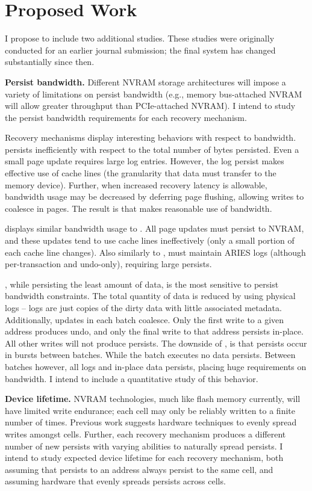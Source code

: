 \section{Proposed Work}
\label{sec:OLTP_eval:Proposed}

I propose to include two additional studies.
These studies were originally conducted for an earlier journal submission; the final system has changed substantially since then.

\textbf{Persist bandwidth.}
Different NVRAM storage architectures will impose a variety of limitations on persist bandwidth (e.g., memory bus-attached NVRAM will allow greater throughput than PCIe-attached NVRAM).
I intend to study the persist bandwidth requirements for each recovery mechanism.

Recovery mechanisms display interesting behaviors with respect to bandwidth.
\NVDisk persists inefficiently with respect to the total number of bytes persisted.
Even a small page update requires large log entries.
However, the log persist makes effective use of cache lines (the granularity that data must transfer to the memory device).
Further, when increased recovery latency is allowable, bandwidth usage may be decreased by deferring page flushing, allowing writes to coalesce in pages.
The result is that \NVDisk makes reasonable use of bandwidth.

\InPlace displays similar bandwidth usage to \NVDisk.
All page updates must persist to NVRAM, and these updates tend to use cache lines ineffectively (only a small portion of each cache line changes).
Also similarly to \NVDisk, \InPlace must maintain ARIES logs (although per-transaction and undo-only), requiring large persists.

\GroupCommit, while persisting the least amount of data, is the most sensitive to persist bandwidth constraints.
The total quantity of data is reduced by using physical logs -- logs are just copies of the dirty data with little associated metadata.
Additionally, updates in each batch coalesce.
Only the first write to a given address produces undo, and only the final write to that address persists in-place.
All other writes will not produce persists.
The downside of \GroupCommit, is that persists occur in bursts between batches.
While the batch executes no data persists.
Between batches however, all logs and in-place data persists, placing huge requirements on bandwidth.
I intend to include a quantitative study of this behavior.

\textbf{Device lifetime.}
NVRAM technologies, much like flash memory currently, will have limited write endurance; each cell may only be reliably written to a finite number of times.
Previous work suggests hardware techniques to evenly spread writes amongst cells.
Further, each recovery mechanism produces a different number of new persists with varying abilities to naturally spread persists.
I intend to study expected device lifetime for each recovery mechanism, both assuming that persists to an address always persist to the same cell, and assuming hardware that evenly spreads persists across cells.

